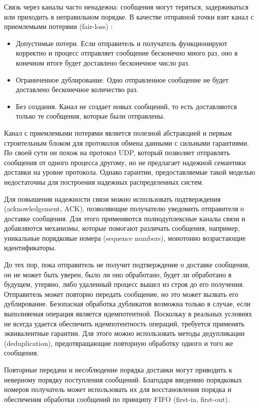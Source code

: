 Связь через каналы часто ненадежна: сообщения могут теряться, задерживаться или
приходить в неправильном порядке. В качестве отправной точки взят канал с
приемлемыми потерями (fair-loss) \cite{cachin11}:

\begin{itemize}
    \item Допустимые потери. Если отправитель и получатель функционируют корректно и
        процесс отправляет сообщение бесконечно много раз, оно в конечном итоге
        будет доставлено бесконечное число раз.
    \item Ограниченное дублирование. Одно отправленное сообщение не будет доставлено
        бесконечное количество раз.
    \item Без создания. Канал не создает новых сообщений, то есть доставляются
        только те сообщения, которые были отправлены.
\end{itemize}

Канал с приемлемыми потерями является полезной абстракцией и первым строительным
блоком для протоколов обмена данными с сильными гарантиями. По своей сути он похож
на протокол UDP, который позволяет отправлять сообщения от одного процесса другому,
но не предлагает надежной семантики доставки на уровне протокола. Однако гарантии,
предоставляемые такой моделью недостаточны для построения надежных распределенных
систем.

Для повышения надежности связи можно использовать подтверждения (acknowledgement,
ACK), позволяющие получателю уведомить отправителя о доставке сообщения. Для
этого применяются полнодуплексные каналы связи и добавляются механизмы,
которые помогают различать сообщения, например, уникальные порядковые номера
(sequence numbers), монотонно возрастающие идентификаторы.

До тех пор, пока отправитель не получит подтверждение о доставке сообщения,
он не может быть уверен, было ли оно обработано, будет ли обработано в будущем,
утеряно, либо удаленный процесс вышел из строя до его получения. Отправитель
может повторно передать сообщение, но это может вызвать его дублирование.
Безопасная обработка дубликатов возможна только в случае, если выполняемая
операция является идемпотентной. Поскольку в реальных условиях не всегда удается
обеспечить идемпотентность операций, требуется применять эквивалентные гарантии.
Для этого можно использовать методы дедупликации (deduplication), предотвращающие
повторную обработку одного и того же сообщения.

Повторные передачи и несоблюдение порядка доставки могут приводить к неверному
порядку поступления сообщений. Благодаря введению порядковых номеров получатель
может использовать их для восстановления порядка и обеспечения обработки сообщений
по принципу FIFO (first-in, first-out).


